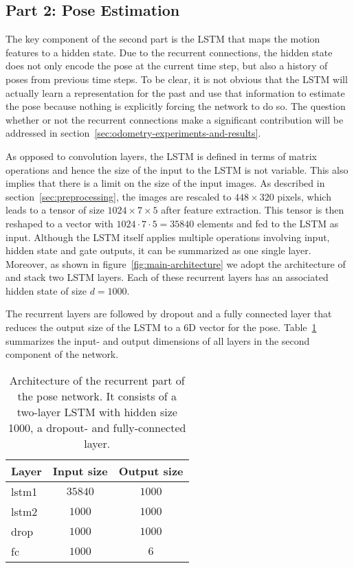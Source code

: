 		\subsection{Part 2: Pose Estimation}
			The key component of the second part is the LSTM that maps the motion features to a hidden state.
			Due to the recurrent connections, the hidden state does not only encode the pose at the current time step, but also a history of poses from previous time steps.
			To be clear, it is not obvious that the LSTM will actually learn a representation for the past and use that information to estimate the pose because nothing is explicitly forcing the network to do so.
			The question whether or not the recurrent connections make a significant contribution will be addressed in section~\ref{sec:odometry-experiments-and-results}.
			
			As opposed to convolution layers, the LSTM is defined in terms of matrix operations and hence the size of the input to the LSTM is not variable.
			This also implies that there is a limit on the size of the input images.
			As described in section~\ref{sec:preprocessing}, the images are rescaled to $448 \times 320$ pixels, which leads to a tensor of size $1024 \times 7 \times 5$ after feature extraction.
			This tensor is then reshaped to a vector with $1024 \cdot 7 \cdot 5 = 35840$ elements and fed to the LSTM as input.
			Although the LSTM itself applies multiple operations involving input, hidden state and gate outputs, it can be summarized as one single layer.
			Moreover, as shown in figure~\ref{fig:main-architecture} we adopt the architecture of~\citeauthor{wang2017deepvo} and stack two LSTM layers.
			Each of these recurrent layers has an associated hidden state of size $d = 1000$.
			
			The recurrent layers are followed by dropout and a fully connected layer that reduces the output size of the LSTM to a 6D vector for the pose.
			Table~\ref{tbl:lstm_and_fc_after_flownet} summarizes the input- and output dimensions of all layers in the second component of the network.
			\begin{table}[tb]
				\small
				\begin{center}
					\begin{tabular}{|l|c|c|}
						\hline
						Layer 		& Input size 					& Output size			\\ \hline
						lstm1 		& $35840$						& $1000$  				\\ \hline
						lstm2 		& $1000$						& $1000$ 				\\ \hline
						drop		& $1000$						& $1000$				\\ \hline
						fc 			& $1000$						& $6$					\\ \hline
					\end{tabular}
				\end{center}
				\caption[Architecture of the recurrent part of the pose network]
						{Architecture of the recurrent part of the pose network.
						 It consists of a two-layer LSTM with hidden size 1000, a dropout- and fully-connected layer.}
				\label{tbl:lstm_and_fc_after_flownet}
			\end{table}
		

